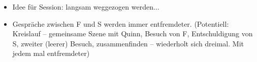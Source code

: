 \begin{itemize}
  \item Idee für Session: langsam weggezogen werden... 
  \item Gespräche zwischen F und S werden immer entfremdeter. (Potentiell:
    Kreislauf -- gemeinsame Szene mit Quinn, Besuch von F, Entschuldigung von
    S, zweiter (leerer) Besuch, zusammenfinden -- wiederholt sich dreimal. Mit
    jedem mal entfremdeter)
\end{itemize}
